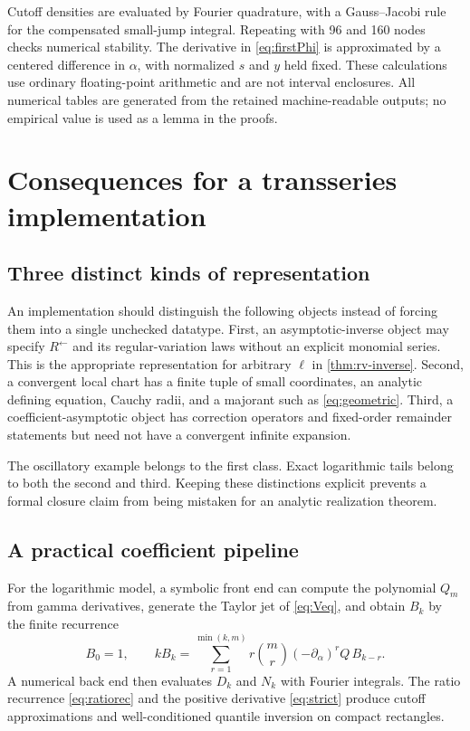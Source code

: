 \documentclass[11pt,a4paper]{article}
\numberwithin{equation}{section}
\theoremstyle{definition}\newtheorem{definition}[theorem]{Definition}
\theoremstyle{remark}\newtheorem{remark}[theorem]{Remark}
\theoremstyle{definition}
\newcommand{\asyminv}{\leftarrow}
\begin{document}
Cutoff densities are evaluated by Fourier quadrature, with a Gauss--Jacobi
rule for the compensated small-jump integral. Repeating with 96 and 160
nodes checks numerical stability. The derivative in \eqref{eq:firstPhi}
is approximated by a centered difference in $\alpha$, with normalized
$s$ and $y$ held fixed. These calculations use ordinary floating-point
arithmetic and are not interval enclosures. All numerical tables are
generated from the retained machine-readable outputs; no empirical value
is used as a lemma in the proofs.

\section{Consequences for a transseries implementation}
\label{sec:implementation}

\subsection{Three distinct kinds of representation}
An implementation should distinguish the following objects instead of
forcing them into a single unchecked datatype. First, an asymptotic-inverse
object may specify $R^\asyminv$ and its regular-variation laws without an
explicit monomial series. This is the appropriate representation for
arbitrary $\ell$ in \cref{thm:rv-inverse}. Second, a convergent local chart
has a finite tuple of small coordinates, an analytic defining equation,
Cauchy radii, and a majorant such as \eqref{eq:geometric}. Third, a
coefficient-asymptotic object has correction operators and fixed-order
remainder statements but need not have a convergent infinite expansion.

The oscillatory example belongs to the first class. Exact logarithmic tails
belong to both the second and third. Keeping these distinctions explicit
prevents a formal closure claim from being mistaken for an analytic
realization theorem.

\subsection{A practical coefficient pipeline}
For the logarithmic model, a symbolic front end can compute the polynomial
$Q_m$ from gamma derivatives, generate the Taylor jet of \eqref{eq:Veq},
and obtain $B_k$ by the finite recurrence
\[
 B_0=1,\qquad k B_k=\sum_{r=1}^{\min(k,m)}r\binom mr
                      (-\partial_\alpha)^rQ\,B_{k-r}.
\]
A numerical back end then evaluates $D_k$ and $N_k$ with Fourier integrals.
The ratio recurrence \eqref{eq:ratiorec} and the positive derivative
\eqref{eq:strict} produce cutoff approximations and well-conditioned
quantile inversion on compact rectangles.
\end{document}
